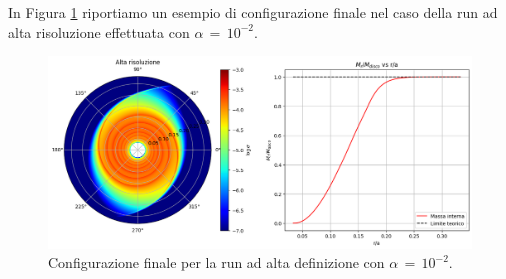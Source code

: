 In Figura \ref{fig:dim_highres} riportiamo un esempio di configurazione finale nel caso della run ad alta risoluzione effettuata con $\alpha\,=\,10^{-2}.$

\begin{figure}[h]
  \centering
  \includegraphics[width=\textwidth]{Immagini/Simulazioni/altadef.png}
  \caption{Configurazione finale per la run ad alta definizione con $\alpha\,=\,10^{-2}$.}
  \label{fig:dim_highres}
\end{figure}
